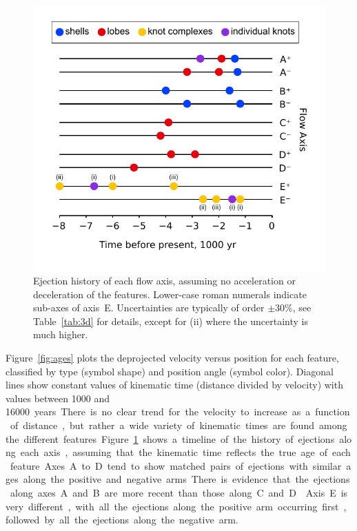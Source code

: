 \documentclass[useAMS, usenatbib]{mnras}
\begin{document}
\begin{figure}
  \includegraphics[width=\linewidth]
  {figs/turtle-flow-axis-history}
  \caption{
    Ejection history of each flow axis,
    assuming no acceleration or deceleration of the features.
    Lower-case roman numerals indicate sub-axes of axis~E.
    Uncertainties are typically of order \(\pm 30\%\),
    see Table~\ref{tab:3d} for details,
    except for (ii) where the uncertainty is much higher.
  }
  \label{fig:axis-history}
\end{figure}

Figure~\ref{fig:ages} plots the deprojected velocity versus position for each feature,
classified by type (symbol shape) and position angle (symbol color).
Diagonal lines show constant values of kinematic time (distance divided by velocity)
with values between \num{1000} and \SI{16000} years.
There is no clear trend for the velocity to increase as a function of distance,
but rather a wide variety of kinematic times are found among the different features.
Figure~\ref{fig:axis-history} shows a timeline of the history of ejections along each axis,
assuming that the kinematic time reflects the true age of each feature.
Axes~A to~D tend to show matched pairs of ejections with similar ages along the positive and negative arms.
There is evidence that the ejections along axes~A and B are more recent than those along C and~D.\@
Axis~E is very different, with all the ejections along the positive arm occurring first,
followed by all the ejections along the negative arm.
\end{document}
